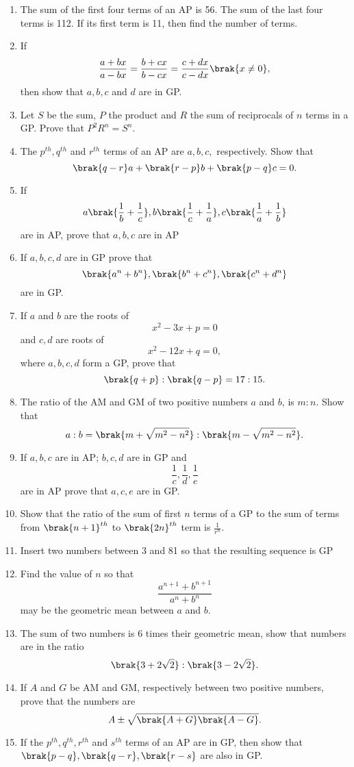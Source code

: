 \begin{enumerate}[label=\thesubsection.\arabic*, ref=\thesubsection.\theenumi]
\item  The sum of the first four terms of an AP  is 56. The sum of the last four terms is 112. If its first term is 11, then find the number of terms.
\item If $$\frac{a+bx}{a-bx} = \frac{b+cx}{b-cx} = \frac{c+dx}{c-dx}\brak{x \neq 0},$$ then show that $a, b, c$ and $d$ are in GP.
\item Let $S$ be the sum, $P$ the product and $R$ the sum of reciprocals of $n$ terms in a GP.  Prove that $P^2R^n = S^n.$ 
\item The $p^{th}, q^{th}$ and $r^{th}$ terms of an AP  are $a, b, c,$ respectively. Show that 
$$\brak{q - r }a + \brak{r - p }b + \brak{p - q }c = 0.$$
\item If $$a\brak{\frac{1}{b}+\frac{1}{c}}, b\brak{\frac{1}{c}+\frac{1}{a}}, c\brak{\frac{1}{a}+\frac{1}{b}}$$ are in AP, prove that $a, b, c$ are in AP 
\item If $a, b, c, d$ are in GP  prove that $$\brak{a^n + b^n}, \brak{b^n + c^n}, \brak{c^n + d^n}$$ are in GP. 
\item If $a$ and $b$ are the roots of $$x^2 - 3x + p = 0$$ and $c, d$ are roots of $$x^2 - 12x + q = 0,$$ where $a, b, c, d$ form a GP,  prove that $$\brak{q + p} : \brak{q - p} = 17:15.$$
\item The ratio of the AM  and GM  of two positive numbers $a$ and $b$, is $m : n$. Show that 
$$a:b = \brak{m+\sqrt{m^2 - n^2}}:\brak{m - \sqrt{m^2 - n^2}}.$$
\item If $a, b, c$ are in AP; $b, c, d$ are in GP  and $$\frac{1}{c}, \frac{1}{d}, \frac{1}{e}$$ are in AP  prove that $a, c, e$ are in GP.
\item Show that the ratio of the sum of first $n$ terms of a GP  to the sum of terms from $\brak{n+1}^{th}$ to $\brak{2n}^{th}$ term is $\frac{1}{r^n}$.
\item Insert two numbers between 3 and 81 so that the resulting sequence is GP 
\item Find the value of $n$ so that $$\frac{a^{n + 1} + b^{n + 1}}{a^n + b^n}$$ may be the geometric mean between $a$ and $b$.
\item The sum of two numbers is 6 times their geometric mean, show that numbers are in the ratio $$\brak{3+2\sqrt{2}}:\brak{3-2\sqrt{2}}.$$
\item If $A$ and $G$ be AM  and GM, respectively between two positive numbers, prove that the numbers are $$A \pm \sqrt{\brak{A+G}\brak{A-G}}.$$
\item If the $p^{th}, q^{th}, r^{th}$ and $s^{th}$ terms of an AP are in GP, then show that $\brak{p-q},\brak{q-r},\brak{r-s}$ are also in GP.

\end{enumerate}
